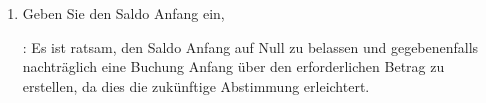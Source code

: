 \begin{enumerate}
\begin{enumerate}
			\item Geben Sie den Saldo Anfang ein,

			\Note{}: Es ist ratsam, den Saldo Anfang auf Null zu belassen und gegebenenfalls nachträglich eine Buchung Anfang über den erforderlichen Betrag zu erstellen, da dies die zukünftige Abstimmung erleichtert.
			

\end{enumerate}
\end{enumerate}
